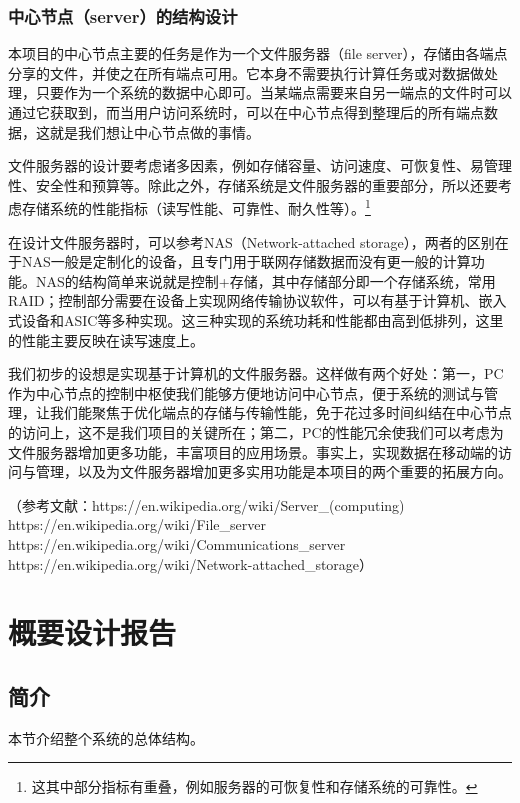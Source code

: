 \documentclass{ctexart}
\begin{document}
\subsubsection{中心节点（server）的结构设计}

本项目的中心节点主要的任务是作为一个文件服务器（file server），存储由各端点分享的文件，并使之在所有端点可用。它本身不需要执行计算任务或对数据做处理，只要作为一个系统的数据中心即可。当某端点需要来自另一端点的文件时可以通过它获取到，而当用户访问系统时，可以在中心节点得到整理后的所有端点数据，这就是我们想让中心节点做的事情。

文件服务器的设计要考虑诸多因素，例如存储容量、访问速度、可恢复性、易管理性、安全性和预算等。除此之外，存储系统是文件服务器的重要部分，所以还要考虑存储系统的性能指标（读写性能、可靠性、耐久性等）。\footnote{这其中部分指标有重叠，例如服务器的可恢复性和存储系统的可靠性。}

在设计文件服务器时，可以参考NAS（Network-attached storage），两者的区别在于NAS一般是定制化的设备，且专门用于联网存储数据而没有更一般的计算功能。NAS的结构简单来说就是控制+存储，其中存储部分即一个存储系统，常用RAID；控制部分需要在设备上实现网络传输协议软件，可以有基于计算机、嵌入式设备和ASIC等多种实现。这三种实现的系统功耗和性能都由高到低排列，这里的性能主要反映在读写速度上。

我们初步的设想是实现基于计算机的文件服务器。这样做有两个好处：第一，PC作为中心节点的控制中枢使我们能够方便地访问中心节点，便于系统的测试与管理，让我们能聚焦于优化端点的存储与传输性能，免于花过多时间纠结在中心节点的访问上，这不是我们项目的关键所在；第二，PC的性能冗余使我们可以考虑为文件服务器增加更多功能，丰富项目的应用场景。事实上，实现数据在移动端的访问与管理，以及为文件服务器增加更多实用功能是本项目的两个重要的拓展方向。

（参考文献：https://en.wikipedia.org/wiki/Server\_(computing)\\
 https://en.wikipedia.org/wiki/File\_server\\ https://en.wikipedia.org/wiki/Communications\_server\\ https://en.wikipedia.org/wiki/Network-attached\_storage）

\section{概要设计报告}

\subsection{简介}
本节介绍整个系统的总体结构。
\end{document}
